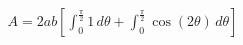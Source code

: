 \documentclass[preview]{standalone}
\begin{document}
\begin{align*}
A = 2ab \left[ \int_0^{\frac{\pi}{2}} 1 \, d\theta + \int_0^{\frac{\pi}{2}} \cos(2\theta) \, d\theta \right]
\end{align*}
\end{document}
